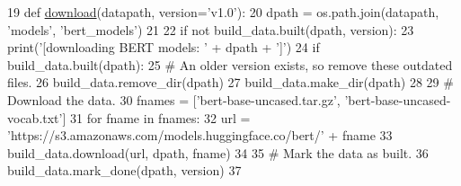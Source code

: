 \begin{DoxyCode}
19 \textcolor{keyword}{def }\hyperlink{namespaceparlai_1_1zoo_1_1pretrained__transformers_1_1build_afaead0deab400e1c516706e85dd4ed9b}{download}(datapath, version='v1.0'):
20     dpath = os.path.join(datapath, \textcolor{stringliteral}{'models'}, \textcolor{stringliteral}{'bert\_models'})
21 
22     \textcolor{keywordflow}{if} \textcolor{keywordflow}{not} build\_data.built(dpath, version):
23         print(\textcolor{stringliteral}{'[downloading BERT models: '} + dpath + \textcolor{stringliteral}{']'})
24         \textcolor{keywordflow}{if} build\_data.built(dpath):
25             \textcolor{comment}{# An older version exists, so remove these outdated files.}
26             build\_data.remove\_dir(dpath)
27         build\_data.make\_dir(dpath)
28 
29         \textcolor{comment}{# Download the data.}
30         fnames = [\textcolor{stringliteral}{'bert-base-uncased.tar.gz'}, \textcolor{stringliteral}{'bert-base-uncased-vocab.txt'}]
31         \textcolor{keywordflow}{for} fname \textcolor{keywordflow}{in} fnames:
32             url = \textcolor{stringliteral}{'https://s3.amazonaws.com/models.huggingface.co/bert/'} + fname
33             build\_data.download(url, dpath, fname)
34 
35         \textcolor{comment}{# Mark the data as built.}
36         build\_data.mark\_done(dpath, version)
37 \end{DoxyCode}

